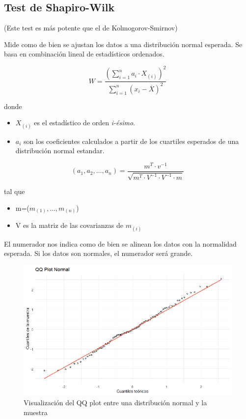 \subsection{Test de Shapiro-Wilk}
(Este test es más potente que el de Kolmogorov-Smirnov)

Mide como de bien se ajustan los datos a una distribución normal esperada. Se basa en combinación lineal de estadísticos ordenados. %

\[
    W=\frac{\left(\sum_{i=1}^{n} a_i \cdot X_{(i)}\right)^2}{\sum_{i=1}^{n}(x_i-\overline{X})^2}
\]

\noindent donde

\begin{itemize}
    \item $X_{(i)}$ es el estadístico de orden \textit{i-ésimo}.
    \item $a_i$ son los coeficientes calculados a partir de los cuartiles esperados de una distribución normal estandar. 
\end{itemize}

\[
    (a_1,a_2,\dots,a_n)=\frac{m^T\cdot v^{-1}}{\sqrt{m^T \cdot V^{-1} \cdot V^{-1} \cdot m}}
\]

\noindent tal que

\begin{itemize}
    \item m=($m_{(1)},\dots,m_{(n)}$)
    \item V es la matriz de las covarianzas de $m_{(i)}$
\end{itemize}

El numerador nos indica como de bien se alinean los datos con la normalidad esperada. Si los datos son normales, el numerador será grande.

\begin{figure}[h!]
    \centering
    \includegraphics[width=\textwidth]{assets/Tema4/QQplot.png}
    \caption{Visualización del QQ plot entre una distribución normal y la muestra}
    \label{fig:qqplot_normal}
\end{figure}